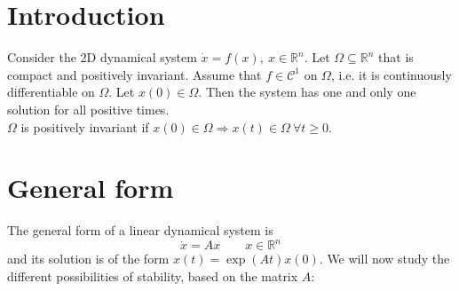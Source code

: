 \documentclass[12pt, openany]{report}
\theoremstyle{definition}
\begin{document}
\section{Introduction}
Consider the 2D dynamical system \(\dot x=f(x),\: x\in \mathbb{R}^n\). Let \(\Omega \subseteq \mathbb{R}^n\) that is compact and positively invariant. Assume that \(f\in \mathcal{C}^1\) on \(\Omega\), i.e. it is continuously differentiable on \(\Omega\). Let \(x(0)\in \Omega\). Then the system has one and only one solution for all positive times. \\

\(\Omega\) is positively invariant if \(x(0)\in \Omega\Longrightarrow x(t)\in \Omega \: \forall t\ge 0\). 
\section{General form}
The general form of a linear dynamical system is 
\begin{equation}
    \dot x=Ax \qquad x\in \mathbb{R}^n
\end{equation}
and its solution is of the form \(x(t) = \exp(At)x(0)\). We will now study the different possibilities of stability, based on the matrix \(A\):
\end{document}
